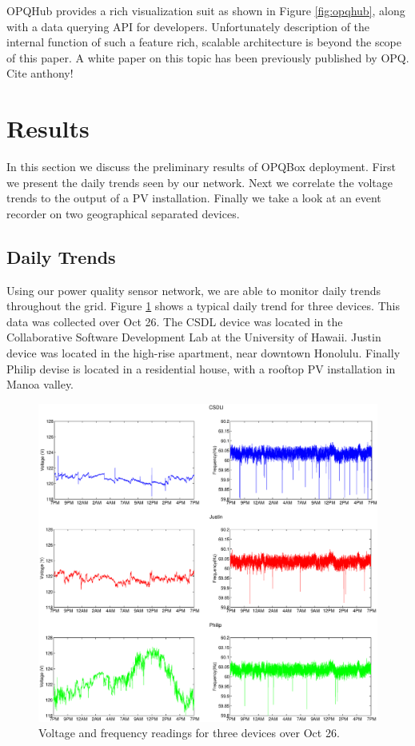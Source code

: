 OPQHub provides a rich visualization suit as shown in Figure \ref{fig:opqhub}, along with a data querying API for developers. Unfortunately description of the internal function
of such a feature rich, scalable architecture is beyond the scope of this paper. A white paper on this topic has been previously published by OPQ. Cite anthony!

\section{Results}

In this section we discuss the preliminary results of  OPQBox deployment. First we present the daily trends seen by our network. Next we correlate the voltage trends to the output
of a PV installation. Finally we take a look at an event recorder on two geographical separated devices.

\subsection{Daily Trends}

Using our power quality sensor network, we are able to monitor daily trends throughout the grid. Figure \ref{fig:trends} shows a typical daily trend for three devices. This data was 
collected over Oct 26. The CSDL device was located in the Collaborative Software Development Lab at the University of Hawaii. Justin device was located in the high-rise apartment, near
downtown Honolulu. Finally Philip devise is located in a residential house, with a rooftop PV installation in Manoa valley.

\begin{figure}[h!]
\centering
\includegraphics[width=\textwidth]{img/1Day.eps}
\caption{Voltage and frequency readings for three devices over Oct 26.}
\label{fig:trends}
\end{figure}

